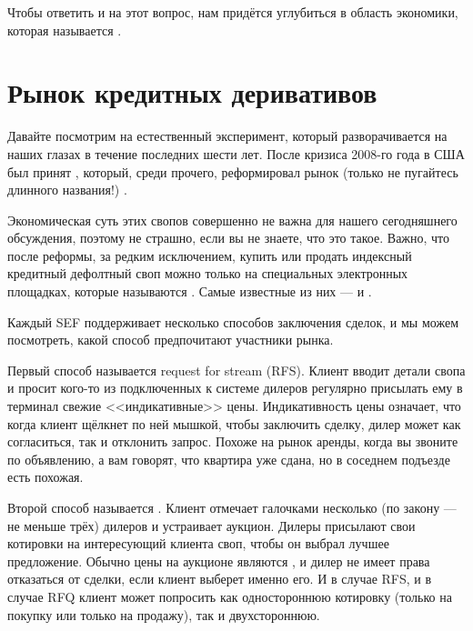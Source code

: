Чтобы ответить и на этот вопрос, нам придётся углубиться в область экономики,
которая называется .

\section*{Рынок кредитных деривативов}

Давайте посмотрим на естественный эксперимент, который разворачивается на наших
глазах в течение последних шести лет. После кризиса 2008-го года в США был
принят , который, среди прочего,
реформировал рынок (только не пугайтесь длинного названия!)  \cite{collin2018}.

Экономическая суть этих свопов совершенно не важна для нашего сегодняшнего
обсуждения, поэтому не страшно, если вы не знаете, что это такое. Важно, что после
реформы, за редким исключением, купить или продать индексный кредитный дефолтный
своп можно только на специальных электронных площадках, которые называются
. Самые известные из них ---
и
.

Каждый SEF поддерживает несколько способов заключения сделок, и мы можем
посмотреть, какой способ предпочитают участники рынка.

Первый способ называется request for stream (RFS). Клиент вводит детали свопа и просит кого-то
из подключенных к системе дилеров регулярно присылать ему в терминал свежие
<<индикативные>> цены. Индикативность цены означает, что когда клиент щёлкнет по
ней мышкой, чтобы заключить сделку, дилер может как согласиться, так и отклонить
запрос. Похоже на рынок аренды, когда вы звоните по объявлению, а вам говорят,
что квартира уже сдана, но в соседнем подъезде есть похожая.

Второй способ называется . Клиент отмечает галочками
несколько (по закону --- не меньше трёх) дилеров и устраивает аукцион. Дилеры
присылают свои котировки на интересующий клиента своп, чтобы он выбрал лучшее
предложение. Обычно цены на аукционе являются , и дилер
не имеет права отказаться от сделки, если клиент выберет именно его. И в случае
RFS, и в случае RFQ клиент может попросить как одностороннюю котировку (только
на покупку или только на продажу), так и двухстороннюю.

